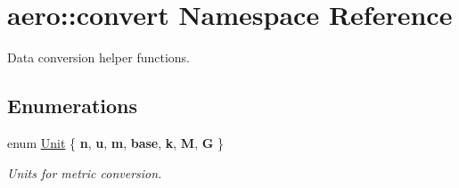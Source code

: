 \hypertarget{namespaceaero_1_1convert}{}\section{aero\+:\+:convert Namespace Reference}
\label{namespaceaero_1_1convert}


Data conversion helper functions.  


\subsection*{Enumerations}
\begin{DoxyCompactItemize}
\item 
\mbox{\label{namespaceaero_1_1convert_afd79904e6a1f0bd81d9491c37004e10e}} 
enum \hyperlink{namespaceaero_1_1convert_afd79904e6a1f0bd81d9491c37004e10e}{Unit} \{ \newline
{\bfseries n}, 
{\bfseries u}, 
{\bfseries m}, 
{\bfseries base}, 
\newline
{\bfseries k}, 
{\bfseries M}, 
{\bfseries G}
 \}\begin{DoxyCompactList}\small\item\em Units for metric conversion. \end{DoxyCompactList}
\end{DoxyCompactItemize}
